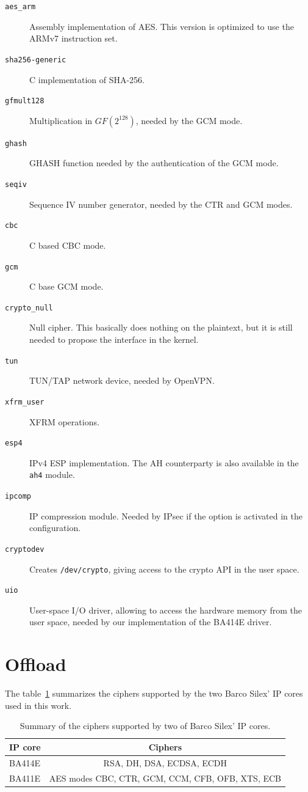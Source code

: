 \begin{description}
	\item[\texttt{aes\_arm}] Assembly implementation of AES. This version is optimized to use the ARMv7 instruction set.
	\item[\texttt{sha256-generic}] C implementation of SHA-256.
	\item[\texttt{gfmult128}] Multiplication in $GF(2^128)$, needed by the GCM mode.
	\item[\texttt{ghash}] GHASH function needed by the authentication of the GCM mode.
	\item[\texttt{seqiv}] Sequence IV number generator, needed by the CTR and GCM modes.
	\item[\texttt{cbc}] C based CBC mode.
	\item[\texttt{gcm}] C base GCM mode.
	\item[\texttt{crypto\_null}] Null cipher. This basically does nothing on the plaintext, but it is still needed to propose the interface in the kernel.
	\item[\texttt{tun}] TUN/TAP network device, needed by OpenVPN.
	\item[\texttt{xfrm\_user}] XFRM operations.
	\item[\texttt{esp4}] IPv4 ESP implementation. The AH counterparty is also available in the \texttt{ah4} module.
	\item[\texttt{ipcomp}] IP compression module. Needed by IPsec if the option is activated in the configuration.
	\item[\texttt{cryptodev}] Creates \texttt{/dev/crypto}, giving access to the crypto API in the user space.
	\item[\texttt{uio}] User-space I/O driver, allowing to access the hardware memory from the user space, needed by our implementation of the BA414E driver.
\end{description}

\section{Offload}

The table~\ref{tab:ip-ciphers} summarizes the ciphers supported by the two Barco Silex' IP cores used in this work.

\begin{table}[ht]
\begin{tabular}{|l|c|}\hline
IP core & Ciphers \\ \hline
BA414E & RSA, DH, DSA, ECDSA, ECDH \\ 
BA411E & AES modes CBC, CTR, GCM, CCM, CFB, OFB, XTS, ECB \\ \hline
\end{tabular}
\caption{Summary of the ciphers supported by two of Barco Silex' IP cores.}{}
\label{tab:ip-ciphers}
\end{table}

